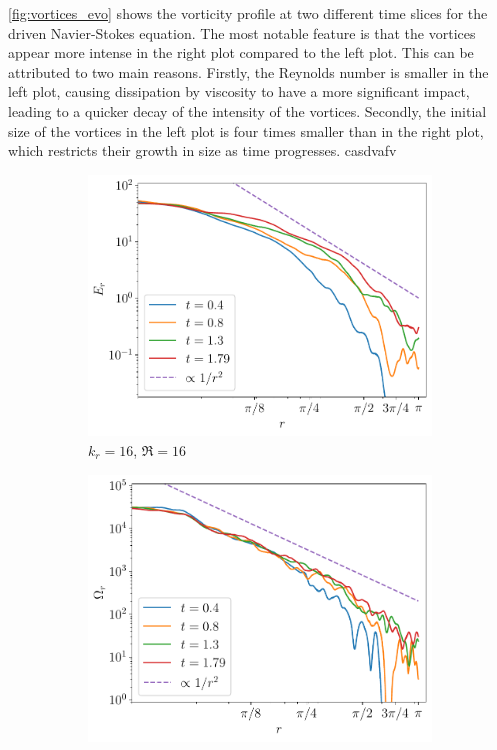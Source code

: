 \documentclass[../main.tex]{subfiles}
\begin{document}
\cref{fig:vortices_evo} shows the vorticity profile at two different time slices for the driven Navier-Stokes equation. The most notable feature is that the vortices appear more intense in the right plot compared to the left plot. This can be attributed to two main reasons. Firstly, the Reynolds number is smaller in the left plot, causing dissipation by viscosity to have a more significant impact, leading to a quicker decay of the intensity of the vortices. Secondly, the initial size of the vortices in the left plot is four times smaller than in the right plot, which restricts their growth in size as time progresses.
casdvafv
\begin{figure}[!ht]
	\centering
	\begin{subfigure}{0.44\textwidth}
		\centering
		\includegraphics[width=\textwidth]{images/Energy_t.kdn16.test6.pdf}
		\caption{$k_r = 16$, $\Re = 16$}
	\end{subfigure}\hspace{0.04\textwidth}
	\begin{subfigure}{0.44\textwidth}
		\centering
		\includegraphics[width=\textwidth]{images/Enstrophy_t.kdn16.test6.pdf}

\end{subfigure}
\end{figure}
\end{document}
